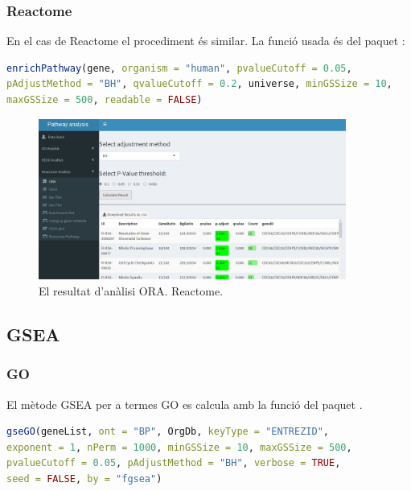\documentclass[]{article}
\begin{document}
\subsubsection{Reactome}
En el cas de Reactome el procediment és similar. La funció usada és  del paquet :

\begin{lstlisting}[language=R]
enrichPathway(gene, organism = "human", pvalueCutoff = 0.05,
pAdjustMethod = "BH", qvalueCutoff = 0.2, universe, minGSSize = 10,
maxGSSize = 500, readable = FALSE)
\end{lstlisting}


\begin{figure}[H]
\centering
\includegraphics[width=0.9\textwidth]{App_F10_Items_Reactome_ORA.png} 
\caption{El resultat d'anàlisi ORA. Reactome.}
\end{figure}

\subsection{GSEA}
\subsubsection{GO}
El mètode GSEA per a termes GO es calcula amb la funció  del paquet . 

\begin{lstlisting}[language=R]
gseGO(geneList, ont = "BP", OrgDb, keyType = "ENTREZID",
exponent = 1, nPerm = 1000, minGSSize = 10, maxGSSize = 500,
pvalueCutoff = 0.05, pAdjustMethod = "BH", verbose = TRUE,
seed = FALSE, by = "fgsea")
\end{lstlisting}
\end{document}
